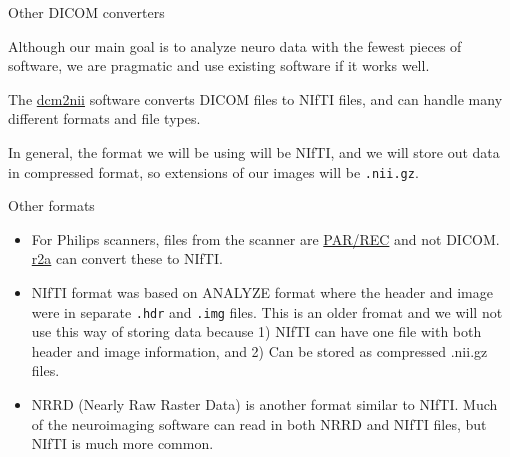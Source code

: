 \documentclass[11pt]{beamer}\usepackage[]{graphicx}\usepackage[]{color}
\begin{document}
\begin{frame}[fragile]{Other DICOM converters}

Although our main goal is to analyze neuro data with the fewest pieces of software, we are pragmatic and use existing software if it works well.

The \href{http://www.mccauslandcenter.sc.edu/mricro/mricron/dcm2nii.html}{dcm2nii} software converts DICOM files to NIfTI files, and can handle many different formats and file types.

In general, the format we will be using will be NIfTI, and we will store out data in compressed format, so extensions of our images will be \verb|.nii.gz|.

\end{frame}

\begin{frame}[fragile]{Other formats}

\begin{itemize}
\item For Philips scanners, files from the scanner are \href{http://sourceforge.net/projects/r2agui/}{PAR/REC} and not DICOM.  \href{http://sourceforge.net/projects/r2agui/}{r2a} can convert these to NIfTI. \\

\item NIfTI format was based on ANALYZE format where the header and image were in separate \verb|.hdr| and \verb|.img| files.  This is an older fromat and we will not use this way of storing data because 1) NIfTI can have one file with both header and image information, and 2) Can be stored as compressed .nii.gz files.\\

\item NRRD (Nearly Raw Raster Data) is another format similar to NIfTI.  Much of the neuroimaging software can read in both NRRD and NIfTI files, but NIfTI is much more common.

\end{itemize}
\end{frame}
\end{document}

